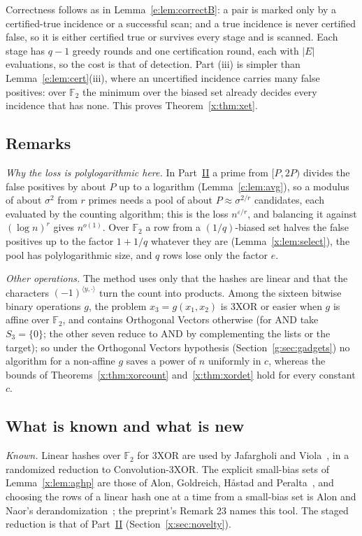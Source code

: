 \documentclass[11pt]{article}
\theoremstyle{definition}
\theoremstyle{remark}
\newcommand{\F}{\mathbb{F}_2}
\begin{document}
Correctness follows as in Lemma~\ref{e:lem:correctB}: a pair is marked only by a certified-true incidence or a successful scan; and a true incidence is never certified false, so it is either certified true or survives every stage and is scanned. Each stage has $q-1$ greedy rounds and one certification round, each with $|E|$ evaluations, so the cost is that of detection. Part (iii) is simpler than Lemma~\ref{e:lem:cert}(iii), where an uncertified incidence carries many false positives: over $\F$ the minimum over the biased set already decides every incidence that has none. This proves Theorem~\ref{x:thm:xet}.

\subsection{Remarks}\label{x:sec:xorremarks}

\emph{Why the loss is polylogarithmic here.} In Part~\hyperref[m:partII]{II} a prime from $[P,2P)$ divides the false positives by about $P$ up to a logarithm (Lemma~\ref{c:lem:avg}), so a modulus of about $\sigma^2$ from $r$ primes needs a pool of about $P\approx\sigma^{2/r}$ candidates, each evaluated by the counting algorithm; this is the loss $n^{\varepsilon/r}$, and balancing it against $(\log n)^r$ gives $n^{o(1)}$. Over $\F$ a row from a $(1/q)$-biased set halves the false positives up to the factor $1+1/q$ whatever they are (Lemma~\ref{x:lem:select}), the pool has polylogarithmic size, and $q$ rows lose only the factor $e$.

\emph{Other operations.} The method uses only that the hashes are linear and that the characters $(-1)^{\langle y,\cdot\rangle}$ turn the count into products. Among the sixteen bitwise binary operations $g$, the problem $x_3=g(x_1,x_2)$ is 3XOR or easier when $g$ is affine over $\F$, and contains Orthogonal Vectors otherwise (for AND take $S_3=\{0\}$; the other seven reduce to AND by complementing the lists or the target); so under the Orthogonal Vectors hypothesis (Section~\ref{g:sec:gadgets}) no algorithm for a non-affine $g$ saves a power of $n$ uniformly in $c$, whereas the bounds of Theorems~\ref{x:thm:xorcount} and~\ref{x:thm:xordet} hold for every constant $c$.

\subsection{What is known and what is new}\label{x:sec:xornovelty}

\emph{Known.} Linear hashes over $\F$ for 3XOR are used by Jafargholi and Viola~\cite[Definition~9]{JV16}, in a randomized reduction to Convolution-3XOR. The explicit small-bias sets of Lemma~\ref{x:lem:aghp} are those of Alon, Goldreich, H\aa stad and Peralta~\cite{AGHP92}, and choosing the rows of a linear hash one at a time from a small-bias set is Alon and Naor's derandomization~\cite[Section~3.1]{AN96}; the preprint's Remark 23 names this tool. The staged reduction is that of Part~\hyperref[m:partII]{II} (Section~\ref{x:sec:novelty}).
\end{document}
